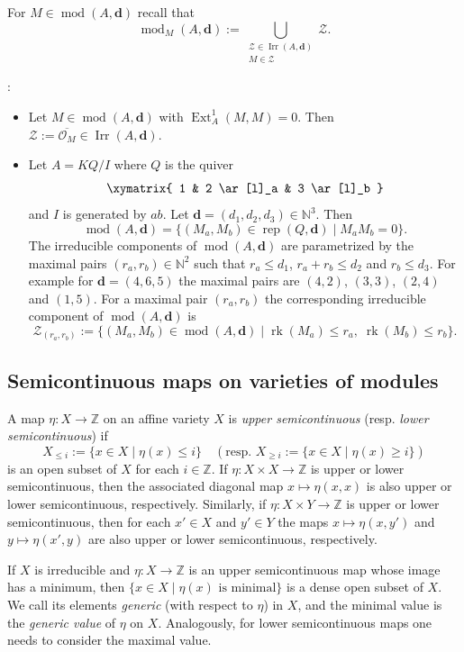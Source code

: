 \documentclass[12pt,reqno]{amsart}
\theoremstyle{definition}
\newcommand{\Z}{\mathbb{Z}}
\newcommand{\N}{\mathbb{N}}
\newcommand{\df}{\colon}
\newcommand{\cO}{{\mathcal O}}
\newcommand{\bd}{\mathbf{d}}
\newcommand{\rk}{\operatorname{rk}}
\newcommand{\md}{\operatorname{mod}}
\newcommand{\rep}{\operatorname{rep}}
\newcommand{\Ext}{\operatorname{Ext}}
\newcommand{\irr}{\operatorname{Irr}}
\newcommand{\calZ}{\mathcal{Z}}
\begin{document}
For $M \in \md(A,\bd)$ recall that
$$
\md_M(A,\bd) :=
\bigcup_{\substack{\calZ \in \irr(A,\bd)\\M \in \calZ}} \calZ.
$$

:
\begin{itemize}\itemsep2mm

\item[(i)]
Let $M \in \md(A,\bd)$ with $\Ext_A^1(M,M) = 0$.
Then $\calZ := \overline{\cO_M} \in \irr(A,\bd)$.

\item[(ii)]
Let $A = KQ/I$ where $Q$ is the quiver
$$
\xymatrix{
1 & 2 \ar[l]_a & 3 \ar[l]_b
}
$$
and $I$ is generated by $ab$.
Let $\bd = (d_1,d_2,d_3) \in \N^3$.
Then
$$
\md(A,\bd)
= \{ (M_a,M_b) \in \rep(Q,\bd) \mid M_aM_b = 0 \}.
$$
The irreducible components
of $\md(A,\bd)$ are parametrized by
the maximal
pairs $(r_a,r_b) \in \N^2$ such that
$r_a \le d_1$,  $r_a+r_b \le d_2$ and $r_b \le d_3$.
For example for $\bd = (4,6,5)$ the maximal pairs are
$(4,2)$, $(3,3)$, $(2,4)$ and $(1,5)$.
For a maximal pair $(r_a,r_b)$ the corresponding irreducible component of $\md(A,\bd)$
is
$$
\calZ_{(r_a,r_b)} := \{ (M_a,M_b) \in \md(A,\bd) \mid
\rk(M_a) \le r_a,\; \rk(M_b) \le r_b \}.
$$
\end{itemize}

\subsection{Semicontinuous maps on varieties of modules}
A map $\eta\df X \to \Z$ on an affine variety $X$ is
\emph{upper semicontinuous} (resp. \emph{lower semicontinuous})
if
$$
X_{\le i} := \{ x \in X \mid \eta(x) \le i \} \quad
(\text{resp. }
X_{\ge i} := \{ x \in X \mid \eta(x) \ge i \})
$$
is an open subset of $X$ for each $i \in \Z$.
If $\eta\df X \times X \to \Z$ is upper or lower semicontinuous,
then the associated diagonal map $x \mapsto \eta(x,x)$ is
also upper or lower semicontinuous, respectively.
Similarly, if $\eta\df X \times Y \to \Z$ is upper or lower semicontinuous,
then for each $x' \in X$ and $y' \in Y$ the maps
$x \mapsto \eta(x,y')$ and $y \mapsto \eta(x',y)$ are
also upper or lower semicontinuous, respectively.

If $X$ is irreducible and $\eta\df X \to \Z$ is an upper
semicontinuous map whose image has a minimum, then
$\{ x \in X \mid \eta(x) \text{ is minimal} \}$
is a dense open subset of $X$.
We call its elements \emph{generic} (with respect to
$\eta$) in $X$, and the minimal value is the
\emph{generic value} of $\eta$ on $X$.
Analogously, for lower semicontinuous maps
one needs to consider the maximal value.
\end{document}
